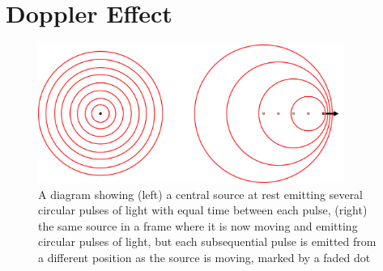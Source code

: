 

\section{Doppler Effect}

\begin{figure}[H]
	\centering
	\includegraphics[width=10cm]{images/pdf/Doppler.pdf}
	\caption{A diagram showing (left) a central source at rest emitting several circular pulses of light with equal time between each pulse, (right) the same source in a frame where it is now moving and emitting circular pulses of light, but each subsequential pulse is emitted from a different position as the source is moving, marked by a faded dot}
	\label{fig: doppler effect intro}
\end{figure}

